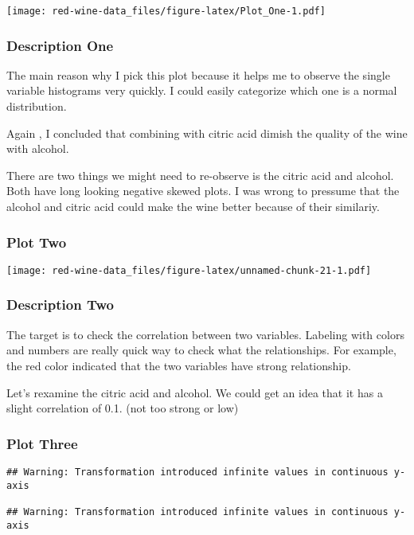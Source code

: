 \documentclass[]{article}
\begin{document}
\texttt{[image: red-wine-data\_files/figure-latex/Plot\_One-1.pdf]}

\subsubsection{Description One}\label{description-one}

The main reason why I pick this plot because it helps me to observe the
single variable histograms very quickly. I could easily categorize which
one is a normal distribution.

Again , I concluded that combining with citric acid dimish the quality
of the wine with alcohol.

There are two things we might need to re-observe is the citric acid and
alcohol. Both have long looking negative skewed plots. I was wrong to
pressume that the alcohol and citric acid could make the wine better
because of their similariy.

\subsubsection{Plot Two}\label{plot-two}

\texttt{[image: red-wine-data\_files/figure-latex/unnamed-chunk-21-1.pdf]}

\subsubsection{Description Two}\label{description-two}

The target is to check the correlation between two variables. Labeling
with colors and numbers are really quick way to check what the
relationships. For example, the red color indicated that the two
variables have strong relationship.

Let's rexamine the citric acid and alcohol. We could get an idea that it
has a slight correlation of 0.1. (not too strong or low)

\subsubsection{Plot Three}\label{plot-three}

\begin{verbatim}
## Warning: Transformation introduced infinite values in continuous y-axis

## Warning: Transformation introduced infinite values in continuous y-axis
\end{verbatim}
\end{document}
